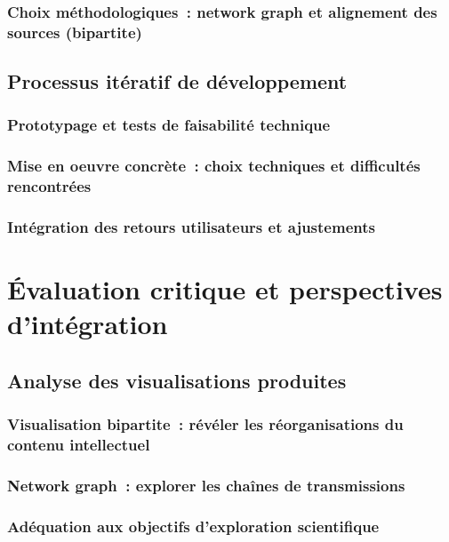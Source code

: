 \documentclass[a4paper,12pt,twoside]{book}
\newcommand{\clearemptydoublepage}{\newpage{\pagestyle{empty}\cleardoublepage}}
\begin{document}
	\section{Choix méthodologiques~: network graph et alignement des sources (bipartite)}

	\clearemptydoublepage

	\chapter{Processus itératif de développement}
	\section{Prototypage et tests de faisabilité technique}

	\section{Mise en oeuvre concrète~: choix techniques et difficultés rencontrées}

	\section{Intégration des retours utilisateurs et ajustements}

	\clearemptydoublepage

	\part{Évaluation critique et perspectives d'intégration}
	\chapter{Analyse des visualisations produites}
	\section{Visualisation bipartite~: révéler les réorganisations du contenu intellectuel}

	\section{Network graph~: explorer les chaînes de transmissions}

	\section{Adéquation aux objectifs d'exploration scientifique}
\end{document}
